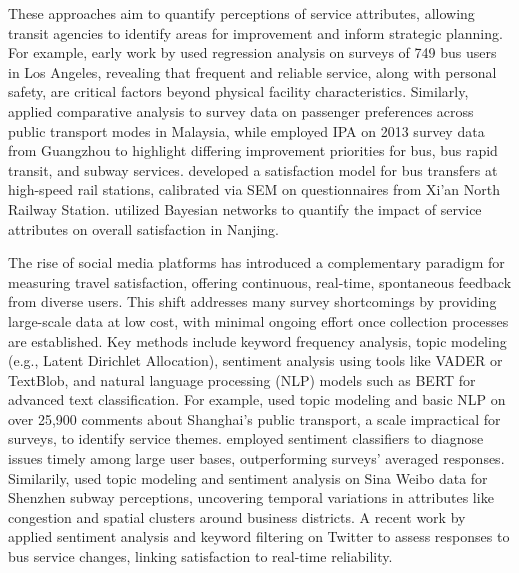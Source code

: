\documentclass[a4paper,fleqn,12pt]{cas-sc}
\begin{document}
These approaches aim to quantify perceptions of service attributes, allowing transit agencies to identify areas for improvement and inform strategic planning. For example, early work by \cite{iseki2010sty} used regression analysis on surveys of 749 bus users in Los Angeles, revealing that frequent and reliable service, along with personal safety, are critical factors beyond physical facility characteristics. Similarly, \cite{ismail2013pas} applied comparative analysis to survey data on passenger preferences across public transport modes in Malaysia, while \cite{cao2017com} employed IPA on 2013 survey data from Guangzhou to highlight differing improvement priorities for bus, bus rapid transit, and subway services. \cite{cheng2018mod} developed a satisfaction model for bus transfers at high-speed rail stations, calibrated via SEM on questionnaires from Xi'an North Railway Station. \cite{wu2016exp} utilized Bayesian networks to quantify the impact of service attributes on overall satisfaction in Nanjing.

The rise of social media platforms has introduced a complementary paradigm for measuring travel satisfaction, offering continuous, real-time, spontaneous feedback from diverse users. This shift addresses many survey shortcomings by providing large-scale data at low cost, with minimal ongoing effort once collection processes are established. Key methods include keyword frequency analysis, topic modeling (e.g., Latent Dirichlet Allocation), sentiment analysis using tools like VADER or TextBlob, and natural language processing (NLP) models such as BERT for advanced text classification. For example, \cite{liu2019nat} used topic modeling and basic NLP on over 25,900 comments about Shanghai's public transport, a scale impractical for surveys, to identify service themes. \cite{mendez2019twi} employed sentiment classifiers to diagnose issues timely among large user bases, outperforming surveys' averaged responses. Similarily, \cite{luo2020urb} used topic modeling and sentiment analysis on Sina Weibo data for Shenzhen subway perceptions, uncovering temporal variations in attributes like congestion and spatial clusters around business districts. A recent work by \cite{alsahar2023twi} applied sentiment analysis and keyword filtering on Twitter to assess responses to bus service changes, linking satisfaction to real-time reliability.
\end{document}
